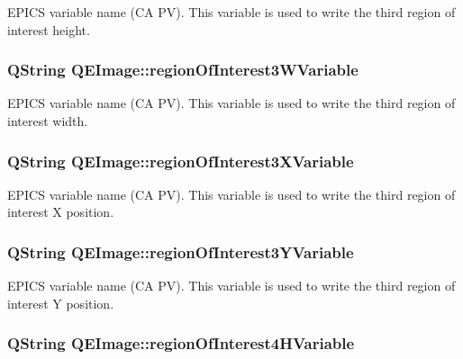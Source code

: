 \label{classQEImage_a1346409293aef0cbd49bfda451e3896d}
EPICS variable name (CA PV). This variable is used to write the third region of interest height. \hypertarget{classQEImage_a54b287f53c049ea4408728c4e4f44696}{
\subsubsection[{regionOfInterest3WVariable}]{\setlength{\rightskip}{0pt plus 5cm}QString QEImage::regionOfInterest3WVariable}}
\label{classQEImage_a54b287f53c049ea4408728c4e4f44696}
EPICS variable name (CA PV). This variable is used to write the third region of interest width. \hypertarget{classQEImage_a11788466a5a7ebc351afa6b21a488ec2}{
\subsubsection[{regionOfInterest3XVariable}]{\setlength{\rightskip}{0pt plus 5cm}QString QEImage::regionOfInterest3XVariable}}
\label{classQEImage_a11788466a5a7ebc351afa6b21a488ec2}
EPICS variable name (CA PV). This variable is used to write the third region of interest X position. \hypertarget{classQEImage_a25e653679179fa91eea118513635d91d}{
\subsubsection[{regionOfInterest3YVariable}]{\setlength{\rightskip}{0pt plus 5cm}QString QEImage::regionOfInterest3YVariable}}
\label{classQEImage_a25e653679179fa91eea118513635d91d}
EPICS variable name (CA PV). This variable is used to write the third region of interest Y position. \hypertarget{classQEImage_a26954e75f3b5dfca80be2a3db7d61e1c}{
\subsubsection[{regionOfInterest4HVariable}]{\setlength{\rightskip}{0pt plus 5cm}QString QEImage::regionOfInterest4HVariable}}
